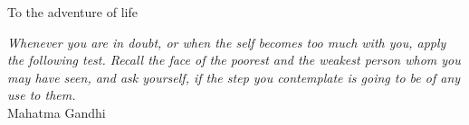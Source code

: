 %
\begin{frontmatter}

%
%

\makefrontmatter

%
%
%
%
%
%
\begin{dedication}
  To the adventure of life
\end{dedication}


%
%



%
%
\begin{epigraph} %

\emph{Whenever you are in doubt, or when the self becomes too much with you, apply the following test. Recall the face of the poorest and the weakest person whom you may have seen, and ask yourself, if the step you contemplate is going to be of any use to them.}\\
Mahatma Gandhi


\end{epigraph}
\end{frontmatter}
